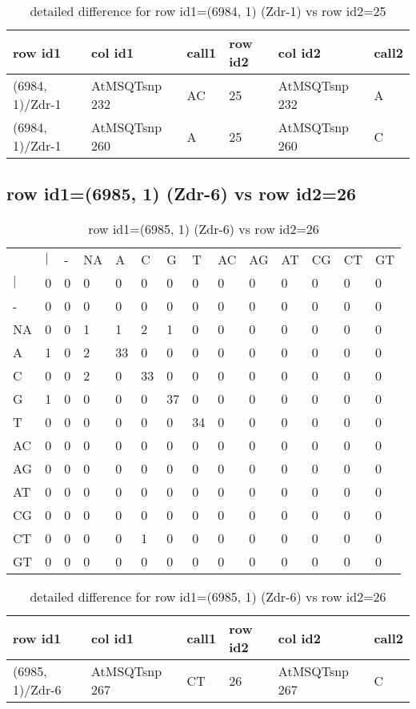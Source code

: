 \begin{center}
\begin{longtable}{|l|l|l|l|l|l|}
\caption{detailed difference for row id1=(6984, 1) (Zdr-1) vs row id2=25} \label{table_dm211}\\
\hline
row id1&col id1&call1&row id2&col id2&call2\\
\hline
(6984, 1)/Zdr-1&AtMSQTsnp 232&AC&25&AtMSQTsnp 232&A\\
(6984, 1)/Zdr-1&AtMSQTsnp 260&A&25&AtMSQTsnp 260&C\\
\hline
\end{longtable}
\end{center}

\subsection{row id1=(6985, 1) (Zdr-6) vs row id2=26}
\begin{center}
\begin{longtable}{|l|l|l|l|l|l|l|l|l|l|l|l|l|l|}
\caption{row id1=(6985, 1) (Zdr-6) vs row id2=26} \label{table_dm212}\\
\hline
\\
\hline
&$|$&-&NA&A&C&G&T&AC&AG&AT&CG&CT&GT\\
$|$&0&0&0&0&0&0&0&0&0&0&0&0&0\\
-&0&0&0&0&0&0&0&0&0&0&0&0&0\\
NA&0&0&1&1&2&1&0&0&0&0&0&0&0\\
A&1&0&2&33&0&0&0&0&0&0&0&0&0\\
C&0&0&2&0&33&0&0&0&0&0&0&0&0\\
G&1&0&0&0&0&37&0&0&0&0&0&0&0\\
T&0&0&0&0&0&0&34&0&0&0&0&0&0\\
AC&0&0&0&0&0&0&0&0&0&0&0&0&0\\
AG&0&0&0&0&0&0&0&0&0&0&0&0&0\\
AT&0&0&0&0&0&0&0&0&0&0&0&0&0\\
CG&0&0&0&0&0&0&0&0&0&0&0&0&0\\
CT&0&0&0&0&1&0&0&0&0&0&0&0&0\\
GT&0&0&0&0&0&0&0&0&0&0&0&0&0\\
\hline
\end{longtable}
\end{center}

\begin{center}
\begin{longtable}{|l|l|l|l|l|l|}
\caption{detailed difference for row id1=(6985, 1) (Zdr-6) vs row id2=26} \label{table_dm213}\\
\hline
row id1&col id1&call1&row id2&col id2&call2\\
\hline
(6985, 1)/Zdr-6&AtMSQTsnp 267&CT&26&AtMSQTsnp 267&C\\
\hline
\end{longtable}
\end{center}

